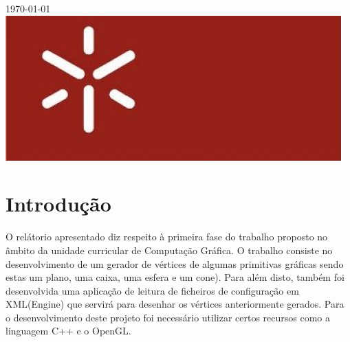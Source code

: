\documentclass[12pt]{article}
\begin{document}
\begin{titlepage}

{\large \today}\\[2cm]


\includegraphics[scale=0.3]{uminho}\\
    

\vfill %

\end{titlepage}
\tableofcontents
\newpage
\section{Introdução}
O relátorio apresentado diz respeito à primeira fase do trabalho proposto no âmbito da unidade curricular de Computação Gráfica. O trabalho
consiste no desenvolvimento de um gerador de vértices de algumas primitivas gráficas sendo estas um plano, uma caixa, uma esfera e um cone). Para além disto, também foi desenvolvida
uma aplicação de leitura de ficheiros de configuração em XML(Engine) que servirá para desenhar os vértices anteriormente gerados. Para o desenvolvimento deste projeto foi
necessário utilizar certos recursos como a linguagem C++ e o OpenGL.
\newpage
\end{document}
